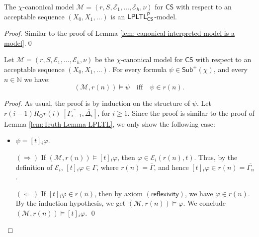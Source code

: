 \documentclass[envcountsect,envcountsame,oribibl,orivec]{llncs}
\newcommand{\lnext}{\bigcirc}
\newcommand{\LPLTLp}{\textsf{LPLTL}^{\sf P}}
\newcommand{\jbox}[1]{\left[#1\right]\!}
\newcommand{\refax}{\ensuremath{(\textsf{reflexivity})}}
\newcommand{\CS}{\textsf{CS}}
\newcommand{\numberofagents}{h}
\newcommand{\agent}{i}
\newcommand{\evidence}{\mathcal{E}}
\newcommand{\valuation}{\nu}
\newcommand{\M}{\mathcal{M}}
\newcommand{\N}{\mathbb{N}}
\renewcommand{\phi}{\varphi}
\newcommand{\Sub}{\mathsf{Sub}}
\newcommand{\RO}[4]{#1 R_\lnext #2\ [#3, #4]}
\begin{document}
\begin{lemma}
	The $\chi$-canonical model $\M = (r,S,\evidence_1,\ldots,\evidence_\numberofagents, \valuation)$ for $\CS$  with respect to an acceptable sequence $(X_0, X_1, \ldots)$ is an $\LPLTLp_\CS$-model.
\end{lemma}
\begin{proof}
	Similar to the proof of Lemma \ref{lem: canonical interpreted model is a model}.\qed
\end{proof}


\begin{lemma}
	Let $\M = (r,S,\evidence_1,\ldots,\evidence_\numberofagents, \valuation)$ be the $\chi$-canonical model for $\CS$ with respect to an acceptable sequence $(X_0, X_1, \ldots)$. For every formula $\psi \in \Sub^+(\chi)$, and every $n \in \N$ we have:
	\[ 
	(\M, r(n)) \models \psi 
	\quad\text{if{f}}\quad
	\psi \in r(n). 
	\]
\end{lemma}
\begin{proof} 
As usual, the proof is by induction on the structure of $\psi$. Let \linebreak $\RO{r(i-1)}{r(i)}{\overline{\Gamma_{i-1}}}{\overline{\Delta_{i}}}$, for $i \geq 1$.
Since the proof is similar to the proof of Lemma \ref{lem:Truth Lemma LPLTL}, we only show the following case:
%
\begin{itemize}
	\item $\psi = \jbox{t}_\agent \phi$.
	
	$(\Rightarrow)$ If $(\M, r(n)) \models \jbox{t}_\agent \phi$, then $\phi \in \evidence_\agent (r(n),t)$. Thus, by the definition of $\evidence_\agent$, $\jbox{t}_\agent \phi \in \Gamma$, where $r(n) = \overline{\Gamma}$, and hence $\jbox{t}_\agent \phi \in r(n)= \overline{\Gamma_n}$. 
	
	$(\Leftarrow)$ If $\jbox{t}_\agent \phi \in r(n)$, then by axiom $\refax$, we have  $\phi \in r(n)$. By the induction hypothesis, we get $(\M, r(n)) \models \phi$. We conclude $(\M, r(n)) \models \jbox{t}_\agent \phi$.
	\qed
\end{itemize}
\end{proof}
\end{document}
